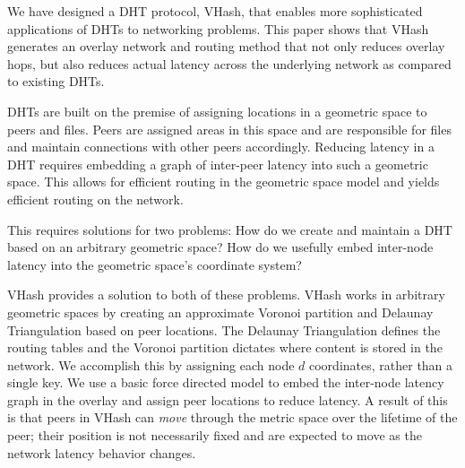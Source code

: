 \documentclass[10pt, conference, letterpaper]{IEEEtran}
\begin{document}
 
We have designed a DHT protocol, VHash, that enables more sophisticated applications of DHTs to networking problems.
This paper shows that VHash generates an overlay network and routing method that not only reduces overlay hops, but also reduces actual latency across the underlying network as compared to existing DHTs.

DHTs are built on the premise of assigning locations in a geometric space to peers and files.
Peers are assigned areas in this space and are responsible for files and maintain connections with other peers accordingly.
Reducing latency in a DHT requires embedding a graph of inter-peer latency into such a geometric space.
This allows for efficient routing in the geometric space model and yields efficient routing on the network.

This requires solutions for two problems:
How do we create and maintain a DHT based on an arbitrary geometric space?
How do we usefully embed inter-node latency into the geometric space's coordinate system?

VHash provides a solution to both of these problems.
VHash works in arbitrary geometric spaces by creating an approximate Voronoi partition and Delaunay Triangulation based on peer locations.
The Delaunay Triangulation defines the routing tables and the Voronoi partition dictates where content is stored in the network.
We accomplish this by assigning each node $d$ coordinates, rather than a single key.
We use a basic force directed model to embed the inter-node latency graph in the overlay and assign peer locations to reduce latency.
A result of this is that peers in VHash can \emph{move} through the metric space over the lifetime of the peer;  their position is not necessarily fixed and are expected to move as the network latency behavior changes.
\end{document}
